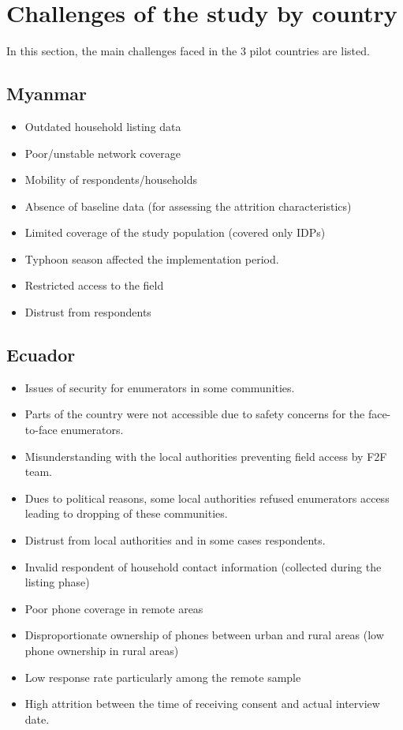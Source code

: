 \documentclass[11pt,harvard]{article}
\begin{document}

\section{Challenges of the study by country}

In this section, the main challenges faced in the 3 pilot countries are listed. 

\subsection{Myanmar}

\begin{itemize}[label=--, left=1.5em]
	\item[1.] Outdated household listing data
	\item[2.] Poor/unstable network coverage
	\item[3.] Mobility of respondents/households
	\item[4.] Absence of baseline data (for assessing the attrition characteristics) 
	\item[5.] Limited coverage of the study population (covered only IDPs)
	\item[6.] Typhoon season affected the implementation period.
	\item[7.] Restricted access to the field
	\item[8.] Distrust from respondents
\end{itemize}


\subsection{Ecuador}

\begin{itemize}[label=--, left=1.5em]
	\item[1.] Issues of security for enumerators in some communities.
		\item[a.]	Parts of the country were not accessible due to safety concerns for the face-to-face enumerators.
	\item[2.] Misunderstanding with the local authorities preventing field access by F2F team.
		\item[a.]	Dues to political reasons, some local authorities refused enumerators access leading to dropping of these communities.
		\item[b.]	Distrust from local authorities and in some cases respondents.
	\item[3.] Invalid respondent of household contact information (collected during the listing phase)
	\item[4.] Poor phone coverage in remote areas
	\item[5.] Disproportionate ownership of phones between urban and rural areas (low phone ownership in rural areas)
	\item[6.] Low response rate particularly among the remote sample
		\item[a.]	High attrition between the time of receiving consent and actual interview date.
\end{itemize}
\end{document}
